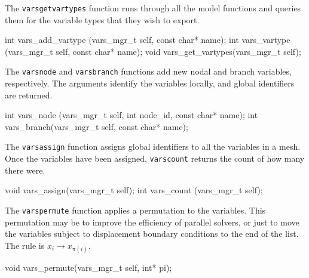 The {\tt{}vars{}get{}vartypes} function runs through all the model functions
and queries them for the variable types that they wish to export.

\nwenddocs{}\plusendmoddef
int  vars_add_vartype (vars_mgr_t self, const char* name);
int  vars_vartype     (vars_mgr_t self, const char* name);
void vars_get_vartypes(vars_mgr_t self);

\nwendcode{}\nwdocspar

The {\tt{}vars{}node} and {\tt{}vars{}branch} functions add new nodal
and branch variables, respectively.  The arguments identify the
variables locally, and global identifiers are returned.

\nwenddocs{}\plusendmoddef
int vars_node  (vars_mgr_t self, int node_id, const char* name);
int vars_branch(vars_mgr_t self, const char* name);

\nwendcode{}\nwdocspar

The {\tt{}vars{}assign} function assigns global identifiers to all
the variables in a mesh.
Once the variables have been assigned, {\tt{}vars{}count} returns
the count of how many there were.

\nwenddocs{}\plusendmoddef
void vars_assign(vars_mgr_t self);
int  vars_count (vars_mgr_t self);

\nwendcode{}\nwdocspar

The {\tt{}vars{}permute} function applies a permutation to the
variables.  This permutation may be to improve the efficiency
of parallel solvers, or just to move the variables subject
to displacement boundary conditions to the end of the list.
The rule is $x_i \rightarrow x_{\pi(i)}$.

\nwenddocs{}\plusendmoddef
void vars_permute(vars_mgr_t self, int* pi);

\nwendcode{}\nwdocspar


